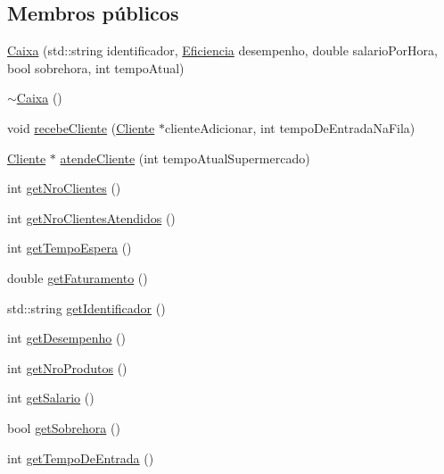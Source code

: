 \subsection*{Membros públicos}
\begin{DoxyCompactItemize}
\item 
\hyperlink{a00001_aad38f50e3c8db674bb5c0ee521665d83}{Caixa} (std\+::string identificador, \hyperlink{a00001_a0e98d0cd8dc2ff4f73d637d73f7bbe85}{Eficiencia} desempenho, double salario\+Por\+Hora, bool sobrehora, int tempo\+Atual)
\item 
\hyperlink{a00001_a3c83a69e735b33cb42b90147bf94563e}{$\sim$\+Caixa} ()
\item 
void \hyperlink{a00001_a49d1c16baa5cba526d2fe483426d1ca7}{recebe\+Cliente} (\hyperlink{a00002}{Cliente} $\ast$cliente\+Adicionar, int tempo\+De\+Entrada\+Na\+Fila)
\item 
\hyperlink{a00002}{Cliente} $\ast$ \hyperlink{a00001_a05be1498241eb73750a857ec5b9a0ddf}{atende\+Cliente} (int tempo\+Atual\+Supermercado)
\item 
int \hyperlink{a00001_a4548bf9e0d9fe4639d85f525dfa284eb}{get\+Nro\+Clientes} ()
\item 
int \hyperlink{a00001_aab9109ad0b89fbce6048e6fb3e2f13c3}{get\+Nro\+Clientes\+Atendidos} ()
\item 
int \hyperlink{a00001_a07735848b240d260fcd573c7642fce60}{get\+Tempo\+Espera} ()
\item 
double \hyperlink{a00001_a2b903d4d0736ea35f09f7e5536fdd71d}{get\+Faturamento} ()
\item 
std\+::string \hyperlink{a00001_a6bc55188d8667812c23223bb19488fef}{get\+Identificador} ()
\item 
int \hyperlink{a00001_a7fea27e506f6a819c133c72c1bece67e}{get\+Desempenho} ()
\item 
int \hyperlink{a00001_ad84ab7878e10d3eeea3025a3594e66b7}{get\+Nro\+Produtos} ()
\item 
int \hyperlink{a00001_a05fe593cdbbd86a3633ac58edda520a7}{get\+Salario} ()
\item 
bool \hyperlink{a00001_a3f846659f43087a6963ecfb7b51f858c}{get\+Sobrehora} ()
\item 
int \hyperlink{a00001_a126611a1682a8720732b48da2759cfca}{get\+Tempo\+De\+Entrada} ()
\end{DoxyCompactItemize}


